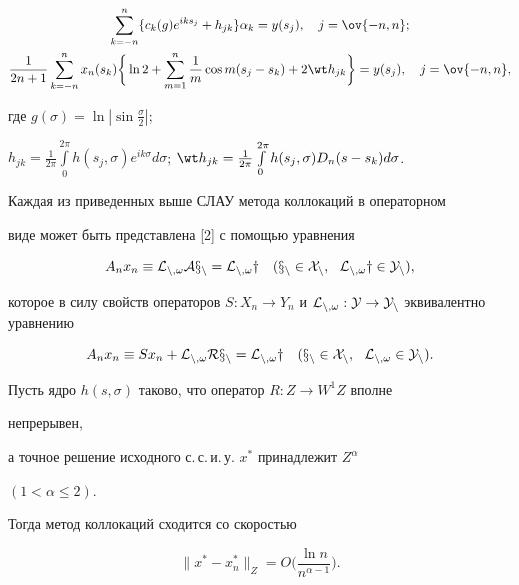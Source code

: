 \begin{gather*} 


\sum^n_{k=-n}\{c_k(g)e^{iks_j}+h_{jk}\}\alpha_k= 


y(s_j),\quad j=\ov{-n,n}; \\ 


% 


\frac{1}{2n+1}\sum^n_{k=-n}x_n(s_k)\bigg\{\ln2+\sum^n_{m=1} 


\frac{1}{m}\cos m(s_j-s_k)+2\wt h_{jk}\bigg\} 


=y(s_j),\quad j=\ov{-n,n}, 


\end{gather*} 


где $g(\sigma)=\ln|\sin\frac{\sigma}{2}|$; 


$h_{jk}=\frac{1}{2\pi}\int\limits^{2\pi}_0 


h(s_j,\sigma)e^{ik\sigma}d\sigma$; $\wt 


h_{jk}=\frac{1}{2\pi}\int\limits^{2\pi}_0 


h(s_j,\sigma)D_n(s-s_k)d\sigma$. 


 


Каждая из приведенных выше СЛАУ метода коллокаций в операторном 


виде может быть представлена [2] с помощью уравнения 


$$ 


A_n x_n\equiv\cal L_{n,\omega}A x_n= 


\cal L_{n,\omega}y\quad (x_n\in X_n,\ \ \cal L_{n,\omega}y\in Y_n), 


$$ 


которое в силу свойств операторов $S:X_n\to Y_n$ и $\cal 


L_{n,\omega}:Y\to Y_n$ эквивалентно уравнению 


$$ 


A_n x_n\equiv S x_n+\cal L_{n,\omega}R x_n= 


\cal L_{n,\omega}y\quad (x_n\in X_n,\ \ \cal L_{n,\omega}\in Y_n). 


$$ 


 


\begin{thm} 


Пусть ядро $h(s,\sigma)$ таково, что оператор $R:Z\to W^1Z$ вполне 


непрерывен, 


а точное решение исходного с.\,с.\,и.\,у. $x^*$ принадлежит $Z^\alpha$ 


$(1<\alpha\le2)$. 


Тогда метод коллокаций сходится со скоростью 


$$ 


\|x^*-x^*_n\|_Z=O\bigg(\frac{\ln n}{n^{\alpha-1}} \bigg). 


$$ 


\end{thm} 


